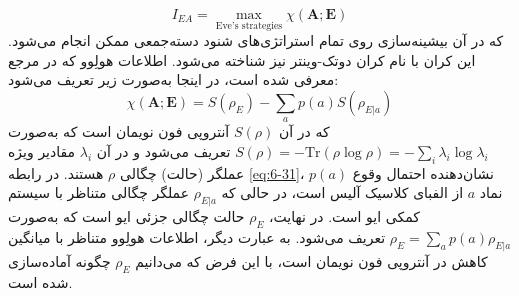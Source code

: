 \begin{equation}
	I_{EA} = \max_{\text{Eve's strategies}} \chi(\bm{A}; \bm{E})
	\label{eq:6-30}
\end{equation}
که در آن بیشینه‌سازی روی تمام استراتژی‌های شنود دسته‌جمعی ممکن انجام می‌شود. این کران با نام کران دوتک-وینتر نیز شناخته می‌شود. اطلاعات هولِوو که در مرجع \cite{53} معرفی شده است، در اینجا به‌صورت زیر تعریف می‌شود:
\begin{equation}
	\chi(\bm{A}; \bm{E}) = S(\rho_E) - \sum_a p(a) S(\rho_{E|a})
	\label{eq:6-31}
\end{equation}
که در آن $S(\rho)$ آنتروپی فون نویمان است که به‌صورت $S(\rho) = -\text{Tr}(\rho \log \rho) = -\sum_i \lambda_i \log \lambda_i$ تعریف می‌شود و در آن $\lambda_i$ مقادیر ویژه عملگر (حالت) چگالی $\rho$ هستند. در رابطه \eqref{eq:6-31}، $p(a)$ نشان‌دهنده احتمال وقوع نماد $a$ از الفبای کلاسیک آلیس است، در حالی که $\rho_{E|a}$ عملگر چگالی متناظر با سیستم کمکی ایو است. در نهایت، $\rho_E$ حالت چگالی جزئی ایو است که به‌صورت $\rho_E = \sum_a p(a) \rho_{E|a}$ تعریف می‌شود. به عبارت دیگر، اطلاعات هولِوو متناظر با میانگین کاهش در آنتروپی فون نویمان است، با این فرض که می‌دانیم $\rho_E$ چگونه آماده‌سازی شده است.



